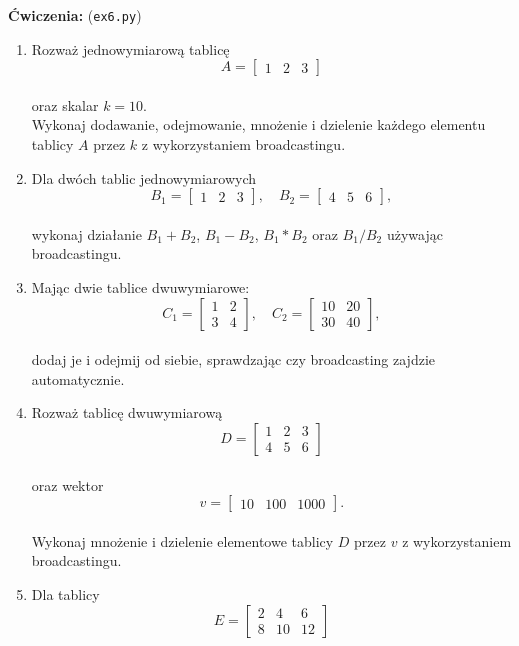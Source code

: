 \documentclass[
  polish,
  letterpaper,
  DIV=11,
  numbers=noendperiod]{scrreprt}
\begin{document}
\textbf{Ćwiczenia:} (\texttt{ex6.py})

\begin{enumerate}
\def\labelenumi{\arabic{enumi}.}
\item
  Rozważ jednowymiarową tablicę\\
  \[A = \begin{bmatrix}1 & 2 & 3\end{bmatrix}\]\\
  oraz skalar \(k = 10\).\\
  Wykonaj dodawanie, odejmowanie, mnożenie i dzielenie każdego elementu
  tablicy \(A\) przez \(k\) z wykorzystaniem broadcastingu.
\item
  Dla dwóch tablic jednowymiarowych\\
  \[B_1 = \begin{bmatrix}1 & 2 & 3\end{bmatrix}, \quad B_2 = \begin{bmatrix}4 & 5 & 6\end{bmatrix},\]\\
  wykonaj działanie \(B_1 + B_2\), \(B_1 - B_2\), \(B_1 * B_2\) oraz
  \(B_1 / B_2\) używając broadcastingu.
\item
  Mając dwie tablice dwuwymiarowe:\\
  \[C_1 = \begin{bmatrix}1 & 2 \\ 3 & 4\end{bmatrix}, \quad C_2 = \begin{bmatrix}10 & 20 \\ 30 & 40\end{bmatrix},\]\\
  dodaj je i odejmij od siebie, sprawdzając czy broadcasting zajdzie
  automatycznie.
\item
  Rozważ tablicę dwuwymiarową\\
  \[D = \begin{bmatrix}1 & 2 & 3 \\ 4 & 5 & 6\end{bmatrix}\]\\
  oraz wektor\\
  \[v = \begin{bmatrix}10 & 100 & 1000\end{bmatrix}.\]\\
  Wykonaj mnożenie i dzielenie elementowe tablicy \(D\) przez \(v\) z
  wykorzystaniem broadcastingu.
\item
  Dla tablicy\\
  \[E = \begin{bmatrix}2 & 4 & 6 \\ 8 & 10 & 12\end{bmatrix}\]\\

\end{enumerate}
\end{document}
